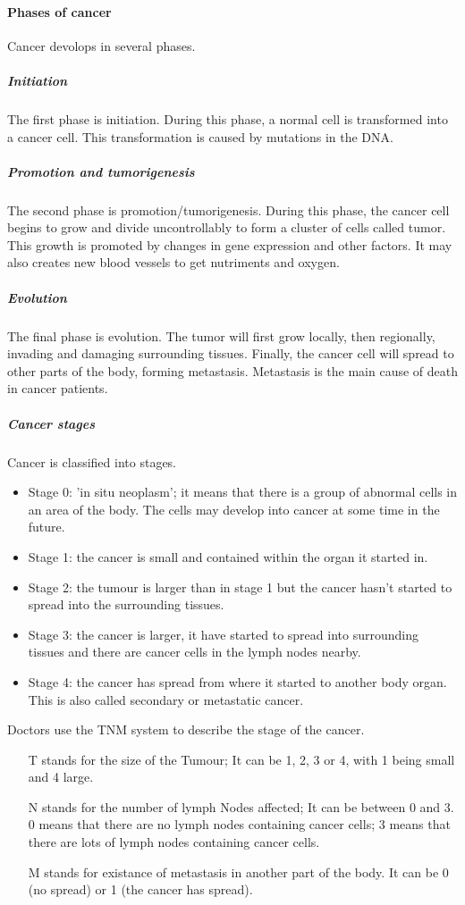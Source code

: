 \paragraph{Phases of cancer}
Cancer devolops in several phases.
\subparagraph{Initiation}
The first phase is initiation.
During this phase, a normal cell is transformed into a cancer cell.
This transformation is caused by mutations in the DNA.
\subparagraph{Promotion and tumorigenesis}
The second phase is promotion/tumorigenesis.
During this phase, the cancer cell begins to grow and divide uncontrollably to form a cluster of cells called tumor.
This growth is promoted by changes in gene expression and other factors\cite{Witsch2010}.
It may also creates new blood vessels to get nutriments and oxygen.
\subparagraph{Evolution}
The final phase is evolution.
The tumor will first grow locally, then regionally, invading and damaging surrounding tissues.
Finally, the cancer cell will spread to other parts of the body, forming metastasis.
Metastasis is the main cause of death in cancer patients\cite{Steeg2006}.

\subparagraph{Cancer stages}
Cancer is classified into stages\cite{cancerresearchuk2023}.
\begin{itemize}
	\item Stage 0: 'in situ neoplasm'; it means that there is a group of abnormal cells in an area of the body. The cells may develop into cancer at some time in the future.
	\item Stage 1: the cancer is small and contained within the organ it started in.
	\item Stage 2: the tumour is larger than in stage 1 but the cancer hasn't started to spread into the surrounding tissues.
	\item Stage 3: the cancer is larger, it have started to spread into surrounding tissues and there are cancer cells in the lymph nodes nearby.
	\item Stage 4: the cancer has spread from where it started to another body organ. This is also called secondary or metastatic cancer.
\end{itemize}
Doctors use the TNM system to describe the stage of the cancer\cite{Brierley2016}.
\begin{itemize}
	\item [T] stands for the size of the Tumour;
	It can be 1, 2, 3 or 4, with 1 being small and 4 large.
	\item [N] stands for the number of lymph Nodes affected;
	It can be between 0 and 3.
	0 means that there are no lymph nodes containing cancer cells; 3 means that there are lots of lymph nodes containing cancer cells.
	\item [M] stands for existance of metastasis in another part of the body.
	It can be 0 (no spread) or 1 (the cancer has spread).
\end{itemize}

